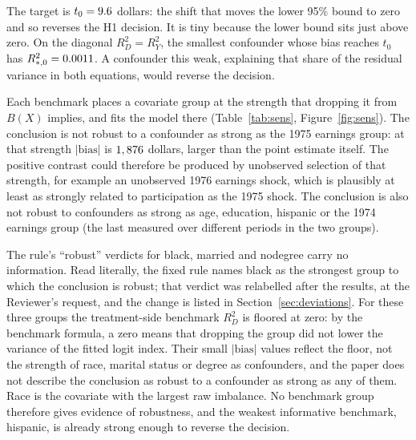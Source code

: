 \documentclass[11pt]{article}
\begin{document}
The target is $t_0 = 9.6$ dollars: the shift that moves the lower 95\% bound to
zero and so reverses the H1 decision. It is tiny because the lower bound sits just above
zero. On the diagonal $R^2_D = R^2_Y$, the smallest confounder whose bias reaches $t_0$ has
$R^2_{*,0} = 0.0011$. A confounder this weak, explaining that share of the residual
variance in both equations, would reverse the decision.

Each benchmark places a covariate group at the strength that dropping it from $B(X)$
implies, and fits the model there (Table~\ref{tab:sens}, Figure~\ref{fig:sens}). The
conclusion is not robust to a confounder as strong as the 1975 earnings group: at that
strength $|\text{bias}|$ is $1,876$ dollars, larger than the point
estimate itself. The positive contrast could therefore be produced by unobserved selection
of that strength, for example an unobserved 1976 earnings shock, which is plausibly at least
as strongly related to participation as the 1975 shock. The conclusion is also not robust
to confounders as strong as age, education, hispanic or the 1974 earnings group (the
last measured over different periods in the two groups).

The rule's ``robust'' verdicts for black, married and nodegree carry no information. Read
literally, the fixed rule names black as the strongest group to which the conclusion is
robust; that verdict was relabelled after the results, at the Reviewer's request, and the
change is listed in Section~\ref{sec:deviations}. For
these three groups the treatment-side benchmark $R^2_D$ is floored at zero: by the benchmark
formula, a zero means that dropping the group did not lower the variance of the fitted logit
index. Their small $|\text{bias}|$ values reflect the floor, not the strength of race,
marital status or degree as confounders, and the paper does not describe the conclusion as
robust to a confounder as strong as any of them. Race is the covariate with the largest raw
imbalance. No benchmark group therefore gives evidence of robustness, and the weakest
informative benchmark, hispanic, is already strong enough to reverse the decision.
\end{document}
